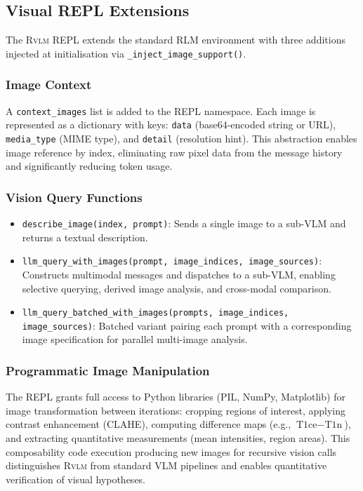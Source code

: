 \documentclass{article}
\newcommand{\RVLM}{\textsc{Rvlm}}
\begin{document}
	\subsection{Visual REPL Extensions}
	\label{sec:visual-repl}
	
	The \RVLM{} REPL extends the standard RLM environment with three additions
	injected at initialisation via \texttt{\_inject\_image\_support()}.
	
	\subsubsection{Image Context}
	A \texttt{context\_images} list is added to the REPL namespace.
	Each image is represented as a dictionary with keys: \texttt{data}
	(base64-encoded string or URL), \texttt{media\_type} (MIME type), and
	\texttt{detail} (resolution hint).
	This abstraction enables image reference by index, eliminating raw pixel
	data from the message history and significantly reducing token usage.
	
	\subsubsection{Vision Query Functions}
	\begin{itemize}[leftmargin=*,itemsep=2pt]
		\item \texttt{describe\_image(index, prompt)}: Sends a single image
		to a sub-VLM and returns a textual description.
		
		\item \texttt{llm\_query\_with\_images(prompt, image\_indices,
			image\_sources)}: Constructs multimodal messages and dispatches to
		a sub-VLM, enabling selective querying, derived image analysis, and
		cross-modal comparison.
		
		\item \texttt{llm\_query\_batched\_with\_images(prompts, image\_indices,
			image\_sources)}: Batched variant pairing each prompt with a
		corresponding image specification for parallel multi-image analysis.
	\end{itemize}
	
	\subsubsection{Programmatic Image Manipulation}
	The REPL grants full access to Python libraries (PIL, NumPy, Matplotlib)
	for image transformation between iterations: cropping regions of interest,
	applying contrast enhancement (CLAHE), computing difference maps
	(e.g., $\text{T1ce} - \text{T1n}$), and extracting quantitative
	measurements (mean intensities, region areas).
	This composability code execution producing new images for recursive
	vision calls distinguishes \RVLM{} from standard VLM pipelines and
	enables quantitative verification of visual hypotheses.
	
\end{document}
